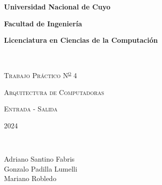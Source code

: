 {\centering
    {\bfseries\Large Universidad Nacional de Cuyo \par}
    \vspace{-0.2cm}
    {\bfseries\Large Facultad de Ingeniería \par}
    \vspace{-0.2cm}
    {\bfseries\Large Licenciatura en Ciencias de la Computación \par}
    \pagestyle{plain}
    \vfill
    \noindent\hrulefill \\
    {\scshape\Huge Trabajo Práctico N\textsuperscript{\Large\underline o} 4\par} %
    \vspace{0.5cm}
    {\scshape\Large Arquitectura de Computadoras \par}
    {\scshape\large Entrada - Salida \par}
    \vspace{0.5cm}
    {\scshape\Large 2024 \par} %
    \noindent\hrulefill \\
    \vspace{2cm}
    {\Large
    Adriano Santino Fabris\\
    Gonzalo Padilla Lumelli\\
    Mariano Robledo
    \par}
    \vfill
    \setcounter{page}{1}
    \newpage
}